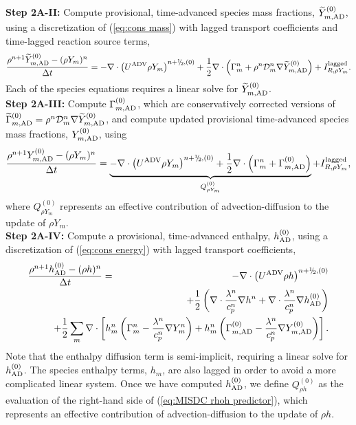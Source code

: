 {\bf Step 2A-II:} Compute provisional, time-advanced species mass fractions,
$\widetilde Y_{m,{\rm AD}}^{(0)}$, using a discretization of (\ref{eq:cons mass}) with lagged transport coefficients 
and time-lagged reaction source terms,
\begin{equation}
\frac{\rho^{n+1}\widetilde Y_{m,{\rm AD}}^{(0)} - (\rho Y_m)^n}{\Delta t} = -\nabla\cdot\left(\uadv\rho Y_m\right)^{n+\myhalf,(0)} + \half\nabla\cdot\left(\Gamma_m^n + \rho^n\mathcal D_m^n\nabla\widetilde Y_{m,{\rm AD}}^{(0)}\right)+ I_{R,\rho Y_m}^{\rm lagged}.
\end{equation}
Each of the species equations requires a linear solve for $\widetilde Y_{m,{\rm AD}}^{(0)}$.\\

{\bf Step 2A-III:} Compute $\Gamma_{m,{\rm AD}}^{(0)}$, which are conservatively corrected versions of 
$\widetilde\Gamma_{m,{\rm AD}}^{(0)} = \rho^n\mathcal D_m^n\nabla\widetilde Y_{m,{\rm AD}}^{(0)}$, and compute updated provisional time-advanced species mass fractions, $Y_{m,{\rm AD}}^{(0)}$, using
\begin{equation}
\frac{\rho^{n+1}Y_{m,{\rm AD}}^{(0)} - (\rho Y_m)^n}{\Delta t} = \underbrace{-\nabla\cdot\left(\uadv\rho Y_m\right)^{n+\myhalf,(0)} + \half\nabla\cdot\left(\Gamma_m^n + \Gamma_{m,{\rm AD}}^{(0)}\right)}_{Q_{\rho Y_m}^{(0)}} + I_{R,\rho Y_m}^{\rm lagged},
\end{equation}
where $Q_{\rho Y_m}^{(0)}$ represents an effective contribution of advection-diffusion to the update of $\rho Y_m$.\\

{\bf Step 2A-IV:} Compute a provisional, time-advanced enthalpy, $h_{\rm AD}^{(0)}$, using a discretization
of (\ref{eq:cons energy}) with lagged transport coefficients,
\begin{eqnarray}
\frac{\rho^{n+1}h_{\rm AD}^{(0)} - (\rho h)^n}{\Delta t} &=& -\nabla\cdot\left(\uadv\rho h\right)^{n+\myhalf,(0)}\nonumber\\
&&\hspace{-2.5cm}+ \half\left(\nabla\cdot\frac{\lambda^n}{c_p^n}\nabla h^n + \nabla\cdot\frac{\lambda^n}{c_p^n}\nabla h_{\rm AD}^{(0)}\right)\nonumber\\
&&\hspace{-2.5cm}+ \half\sum_m\nabla\cdot\left[h_m^n\left(\Gamma_m^n - \frac{\lambda^n}{c_p^n}\nabla Y_m^n\right) + h_m^n\left(\Gamma_{m,{\rm AD}}^{(0)} - \frac{\lambda^n}{c_p^n}\nabla Y_{m,{\rm AD}}^{(0)}\right)\right].\label{eq:MISDC rhoh predictor}
\end{eqnarray}
Note that the enthalpy diffusion term is semi-implicit, requiring a linear solve for $h_{\rm AD}^{(0)}$.
The species enthalpy terms, $h_m$, are also lagged in order to avoid a more complicated linear system.
Once we have computed $h_{\rm AD}^{(0)}$, we define $Q_{\rho h}^{(0)}$ as the evaluation of the 
right-hand side of (\ref{eq:MISDC rhoh predictor}), which represents an effective contribution of 
advection-diffusion to the update of $\rho h$.\\

